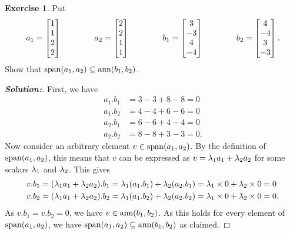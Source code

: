 \documentclass[a4paper]{amsart}
\theoremstyle{definition}
\newtheorem{exercise}{Exercise}
\newenvironment{solution}{\begin{proof}[\textbf{Solution:}] \vphantom{u}}{\end{proof}}
\begin{document}
\begin{exercise}\label{ex-span-in-ann}
 Put 
 \[ a_1 = \left[\begin{matrix} 1 \\ 1 \\ 2 \\ 2 \end{matrix}\right] \hspace{4em}
    a_2 = \left[\begin{matrix} 2 \\ 2 \\ 1 \\ 1 \end{matrix}\right] \hspace{4em}
    b_1 = \left[\begin{matrix} 3 \\ -3 \\ 4 \\ -4 \end{matrix}\right] \hspace{4em}
    b_2 = \left[\begin{matrix} 4 \\ -4 \\ 3 \\ -3 \end{matrix}\right].
 \] 
 Show that $\operatorname{span}(a_1,a_2)\subseteq\operatorname{ann}(b_1,b_2)$.
\end{exercise}
\begin{solution}
 First, we have
 \begin{align*}
  a_1.b_1 &= 3-3+8-8 = 0 \\
  a_1.b_2 &= 4-4+6-6 = 0 \\
  a_2.b_1 &= 6-6+4-4 = 0 \\
  a_2.b_2 &= 8-8+3-3 = 0.
 \end{align*}
 Now consider an arbitrary element $v\in\operatorname{span}(a_1,a_2)$.  By the
 definition of $\operatorname{span}(a_1,a_2)$, this means that $v$ can be expressed
 as $v=\lambda_1a_1+\lambda_2a_2$ for some scalars $\lambda_1$ and $\lambda_2$.  This
 gives 
 \begin{align*}
  v.b_1 &= (\lambda_1a_1+\lambda_2a_2).b_1 = 
           \lambda_1(a_1.b_1) + \lambda_2 (a_2.b_1) = 
           \lambda_1\times 0 + \lambda_2\times 0 = 0 \\
  v.b_2 &= (\lambda_1a_1+\lambda_2a_2).b_2 = 
           \lambda_1(a_1.b_2) + \lambda_2 (a_2.b_2) = 
           \lambda_1\times 0 + \lambda_2\times 0 = 0.
 \end{align*}
 As $v.b_1=v.b_2=0$, we have $v\in\operatorname{ann}(b_1,b_2)$.  As this holds for
 every element of $\operatorname{span}(a_1,a_2)$, we have
 $\operatorname{span}(a_1,a_2)\subseteq\operatorname{ann}(b_1,b_2)$ as claimed.
\end{solution}
\end{document}
